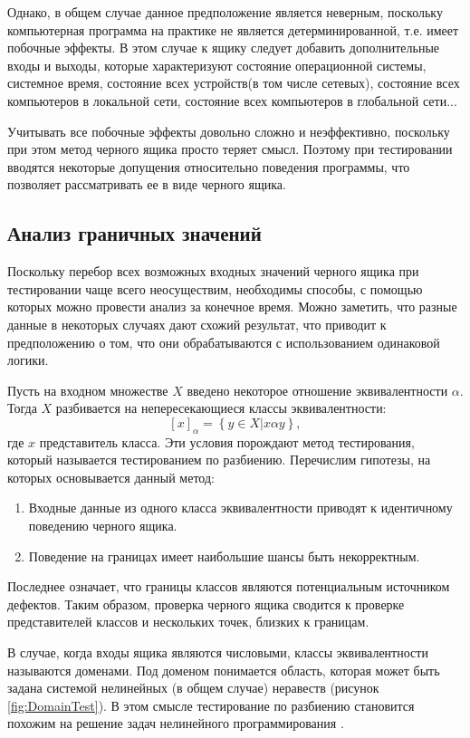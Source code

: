\documentclass[a4paper,14pt,href]{article}
\begin{document}
	Однако, в общем случае данное предположение является неверным, поскольку компьютерная программа на практике не является детерминированной, т.е. имеет побочные эффекты. В этом случае к ящику следует добавить дополнительные входы и выходы, которые характеризуют состояние операционной системы, системное время, состояние всех устройств(в том числе сетевых), состояние всех компьютеров в локальной сети, состояние всех компьютеров в глобальной сети...

	Учитывать все побочные эффекты довольно сложно и неэффективно, поскольку при этом метод черного ящика просто теряет смысл. Поэтому при тестировании вводятся некоторые допущения относительно поведения программы, что позволяет рассматривать ее в виде черного ящика.

\subsection{Анализ граничных значений}
	Поскольку перебор всех возможных входных значений черного ящика при тестировании чаще всего неосуществим, необходимы способы, с помощью которых можно провести анализ за конечное время. Можно заметить, что разные данные в некоторых случаях дают схожий результат, что приводит к предположению о том, что они обрабатываются с использованием одинаковой логики.

	Пусть на входном множестве $X$ введено некоторое отношение эквивалентности $\alpha$. Тогда $X$ разбивается на непересекающиеся классы эквивалентности:
	$$ [x]_{\alpha} = \left \{   y \in X | x \alpha y\right \}, $$
где $x$ представитель класса. Эти условия порождают метод тестирования, который называется тестированием по разбиению. Перечислим гипотезы, на которых основывается данный метод:

\begin{enumerate}
\item Входные данные из одного класса эквивалентности приводят к идентичному поведению черного ящика.
\item Поведение на границах имеет наибольшие шансы быть некорректным.
\end{enumerate}

	Последнее означает, что границы классов являются потенциальным источником дефектов. Таким образом, проверка черного ящика сводится к проверке представителей классов и нескольких точек, близких к границам.

	В случае, когда входы ящика являются числовыми, классы эквивалентности называются доменами\cite{TestingBlackBox}. Под доменом понимается область, которая может быть задана системой нелинейных (в общем случае) неравеств (рисунок \ref{fig:DomainTest}). В этом смысле тестирование по разбиению становится похожим на решение задач нелинейного программирования \cite{OptimisationMethods}.
\end{document}
